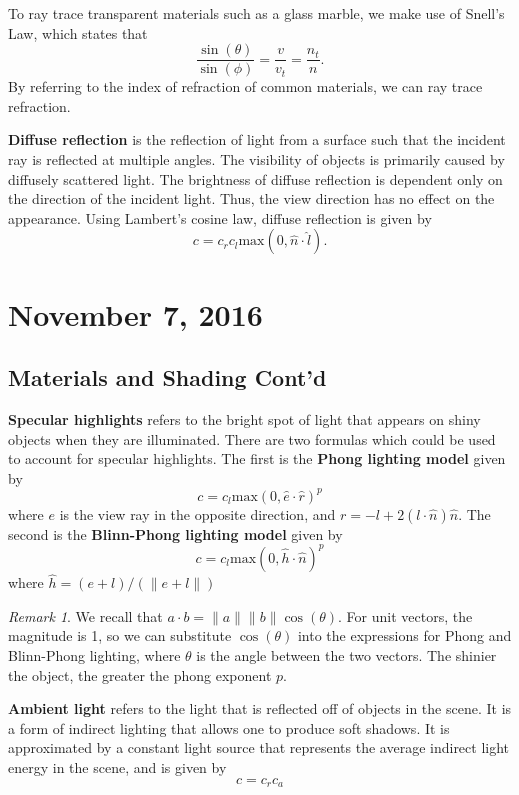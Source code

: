 \documentclass[11pt]{article}
\theoremstyle{plain} %
\theoremstyle{definition}
\theoremstyle{example}
\theoremstyle{remark}
\newtheorem*{remark}{Remark}
\begin{document}
To ray trace transparent materials such as a glass marble, we make use of Snell's Law, which states that $$\frac{\sin(\theta)}{\sin(\phi)} = \frac{v}{v_t} = \frac{n_t}{n}.$$
By referring to the index of refraction of common materials, we can ray trace refraction. 

\textbf{Diffuse reflection} is the reflection of light from a surface such that the incident ray is reflected at multiple angles. The visibility of objects is primarily caused by diffusely scattered light. The brightness of diffuse reflection is dependent only on the direction of the incident light. Thus, the view direction has no effect on the appearance. Using Lambert's cosine law, diffuse reflection is given by 
$$c = c_rc_l\text{max}\left(0, \hat{n} \cdot \hat{l}\right).$$



\section{November 7, 2016}
\subsection{Materials and Shading Cont'd}

\textbf{Specular highlights} refers to the bright spot of light that appears on shiny objects when they are illuminated. There are two formulas which could be used to account for specular highlights. The first is the \textbf{Phong lighting model} given by 
$$c = c_l\text{max}\left(0, \hat{e} \cdot\hat{r}\right)^p$$
where $e$ is the view ray in the opposite direction, and $r = -l+2\left(l \cdot \hat{n}\right)\hat{n}$. The second is the \textbf{Blinn-Phong lighting model} given by 
$$c = c_l\text{max}\left(0, \hat{h} \cdot \hat{n}\right)^p$$ 
where $\hat{h} = (e+l)/\left(\|e+l\|\right)$

\begin{remark}We recall that $a \cdot b = \|a\|\|b\|\cos(\theta)$. For unit vectors, the magnitude is 1, so we can substitute $\cos(\theta)$ into the expressions for Phong and Blinn-Phong lighting, where $\theta$ is the angle between the two vectors. The shinier the object, the greater the phong exponent $p$.\end{remark}

\textbf{Ambient light} refers to the light that is reflected off of objects in the scene. It is a form of indirect lighting that allows one to produce soft shadows. It is approximated by a constant light source that represents the average indirect light energy in the scene, and is given by 
$$c = c_rc_a$$
\end{document}
